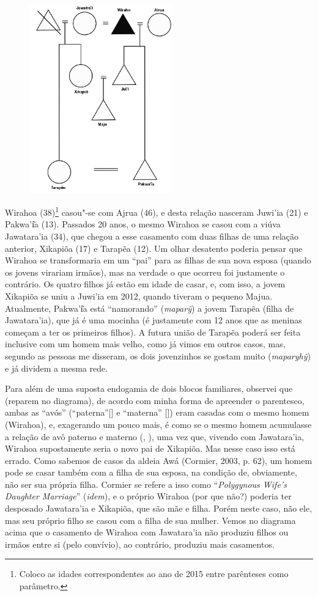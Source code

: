 \begin{figure}[H]
\centering
  \includegraphics[width=6.2cm]{./imgs/Figura_11b}
\end{figure}

Wirahoa (38)\footnote{Coloco as idades correspondentes ao ano de 2015
  entre parênteses como parâmetro.} casou"-se com Ajrua (46), e desta
relação nasceram Juwi'ia (21) e Pakwa'i͂a (13). Passados 20 anos, o mesmo
Wirahoa se casou com a viúva Jawatara'ia (34), que chegou a esse
casamento com duas filhas de uma relação anterior, Xikapiõa (17) e
Tarapẽa (12). Um olhar desatento poderia pensar que Wirahoa se
transformaria em um ``pai'' para as filhas de sua nova esposa (quando os
jovens virariam irmãos), mas na verdade o que ocorreu foi justamente o
contrário. Os quatro filhos já estão em idade de casar, e, com isso, a
jovem Xikapiõa se uniu a Juwi'ia em 2012, quando tiveram o pequeno
Majua. Atualmente, Pakwa'i͂a está ``namorando'' (\emph{maparỹ}) a jovem
Tarapẽa (filha de Jawatara'ia), que já é uma mocinha (é justamente com
12 anos que as meninas começam a ter os primeiros filhos). A futura
união de Tarapẽa poderá ser feita inclusive com um homem mais velho,
como já vimos em outros casos, mas, segundo as pessoas me disseram, os
dois jovenzinhos se gostam muito (\emph{maparyhỹ}) e já dividem a mesma
rede.

Para além de uma suposta endogamia de dois blocos familiares, observei
que (reparem no diagrama), de acordo com minha forma de apreender o
parentesco, ambas as ``avós'' (``paterna''[] e ``materna''
[]) eram casadas com o mesmo homem (Wirahoa), e, exagerando um
pouco mais, é como se o mesmo homem acumulasse a relação de avô paterno
e materno (, ), uma vez que, vivendo com Jawatara'ia, Wirahoa
supostamente seria o novo pai de Xikapiõa. Mas nesse caso isso está
errado. Como sabemos de casos da aldeia Awá (Cormier, 2003, p. 62),
um homem pode se casar também com a filha de sua esposa, na condição de,
obviamente, não ser sua própria filha. Cormier se refere a isso como
``\emph{Polygynous Wife's Daughter Marriage}'' (\emph{idem}), e o próprio
Wirahoa (por que não?) poderia ter desposado Jawatara'ia e Xikapiõa, que
são mãe e filha. Porém neste caso, não ele, mas seu próprio filho se
casou com a filha de sua mulher. Vemos no diagrama acima que o casamento
de Wirahoa com Jawatara'ia não produziu filhos ou irmãos entre si (pelo
convívio), ao contrário, produziu mais casamentos.

